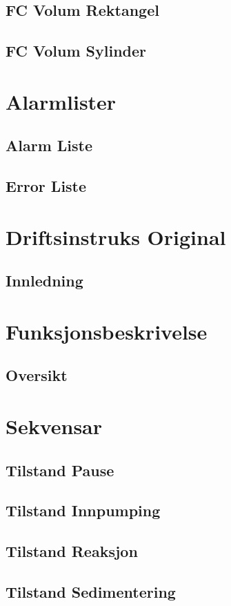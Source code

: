 \section{FC Volum Rektangel}
\section{FC Volum Sylinder}

\chapter{Alarmlister}
\section{Alarm Liste}
\section{Error Liste}

\chapter{Driftsinstruks Original}
\section{Innledning}

\chapter{Funksjonsbeskrivelse}
\section{Oversikt}

\chapter{Sekvensar}
\section{Tilstand Pause}
\section{Tilstand Innpumping}
\section{Tilstand Reaksjon}
\section{Tilstand Sedimentering}
